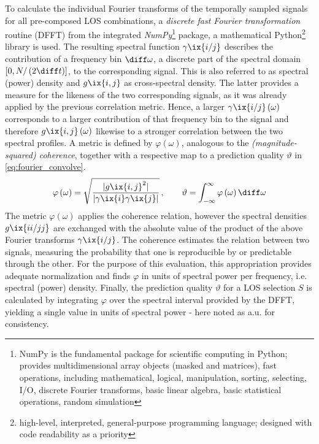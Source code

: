             To calculate the individual Fourier transforms of the temporally sampled signals for all pre-composed LOS combinations, a \textit{discrete fast Fourier transformation} routine (DFFT) from the integrated \textit{NumPy}\footnote[1]{NumPy is the fundamental package for scientific computing in Python; provides multidimensional array objects (masked and matrices), fast operations, including mathematical, logical, manipulation, sorting, selecting, I/O, discrete Fourier transforms, basic linear algebra, basic statistical operations, random simulation} package, a mathematical Python\footnote[2]{high-level, interpreted, general-purpose programming language; designed with code readability as a priority} library is used\cite{NumPyFFT}. The resulting spectral function $\gamma\ix{i/j}$ describes the contribution of a frequency bin $\diff\omega$, a discrete part of the spectral domain $\left[0,N/\left(2\diff t\right)\right]$, to the corresponding signal\cite{NumPyFFTFreq}. This is also referred to as spectral (power) density and $g\ix{i,j}$ as cross-spectral density. The latter provides a measure for the likeness of the two corresponding signals, as it was already applied by the previous correlation metric. Hence, a larger $\gamma\ix{i/j}\left(\omega\right)$ corresponds to a larger contribution of that frequency bin to the signal and therefore $g\ix{i,j}\left(\omega\right)$ likewise to a stronger correlation between the two spectral profiles. A  metric is defined by $\varphi\left(\omega\right)$, analogous to the \textit{(magnitude-squared) coherence}\cite{WikiCoherence}, together with a respective map to a prediction quality $\vartheta$ in \cref{eq:fourier_convolve}.%
%
            \begin{align}%
                \begin{split}\label{eq:fourier_convolve}%
                    \varphi\left(\omega\right)=\sqrt{%
                        \frac{\vert g\ix{i,j}^{2}\vert}{\vert\gamma\ix{i}\gamma\ix{j}\vert}}%
                    \,,\qquad\vartheta=\int_{-\infty}^{\infty}\varphi\left(\omega\right)\diff \omega%
                \end{split}%
            \end{align}%
%
            The metric $\varphi\left(\omega\right)$ applies the coherence relation, however the spectral densities $g\ix{ii/jj}$ are exchanged with the absolute value of the product of the above Fourier transforms $\gamma\ix{i/j}$. The coherence estimates the relation between two signals, measuring the probability that one is reproducible by or predictable through the other. For the purpose of this evaluation, this appropriation provides adequate normalization and finds $\varphi$ in units of spectral power per frequency, i.e. spectral (power) density. Finally, the prediction quality $\vartheta$ for a LOS selection $S$ is calculated by integrating $\varphi$ over the spectral interval provided by the DFFT, yielding a single value in units of spectral power - here noted as a.u. for consistency.\\%
